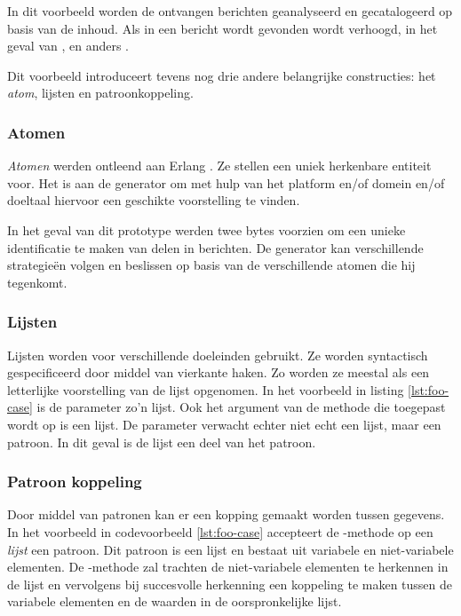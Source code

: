 In dit voorbeeld worden de ontvangen berichten geanalyseerd en gecatalogeerd op
basis van de inhoud. Als in een bericht  wordt gevonden wordt
 verhoogd, in het geval van , 
en anders .

Dit voorbeeld introduceert tevens nog drie andere belangrijke constructies: het
\emph{atom}, lijsten en patroonkoppeling.

\vspace{-3mm}

\subsubsection{Atomen}

\emph{Atomen} werden ontleend aan Erlang \cite{armstrong1993concurrent}. Ze
stellen een uniek herkenbare entiteit voor. Het is aan de generator om met hulp
van het platform en/of domein en/of doeltaal hiervoor een geschikte
voorstelling te vinden.

In het geval van dit prototype werden twee bytes voorzien om een unieke
identificatie te maken van delen in berichten. De generator kan verschillende
strategie\"en volgen en beslissen op basis van de verschillende atomen die hij
tegenkomt.

\vspace{-3mm}

\subsubsection{Lijsten}

Lijsten worden voor verschillende doeleinden gebruikt. Ze worden syntactisch
gespecificeerd door middel van vierkante haken. Zo worden ze meestal als een
letterlijke voorstelling van de lijst opgenomen. In het voorbeeld in listing
\ref{lst:foo-case} is de  parameter zo'n lijst. Ook het argument
van de  methode die toegepast wordt op  is een
lijst. De parameter verwacht echter niet echt een lijst, maar een patroon. In
dit geval is de lijst een deel van het patroon.

\vspace{-3mm}

\subsubsection{Patroon koppeling}

Door middel van patronen kan er een kopping gemaakt worden tussen gegevens. In
het voorbeeld in codevoorbeeld \ref{lst:foo-case} accepteert de
-methode op een \emph{lijst} een patroon. Dit patroon is een
lijst en bestaat uit variabele en niet-variabele elementen. De
-methode zal trachten de niet-variabele elementen te herkennen in
de lijst en vervolgens bij succesvolle herkenning een koppeling te maken tussen
de variabele elementen en de waarden in de oorspronkelijke lijst.

